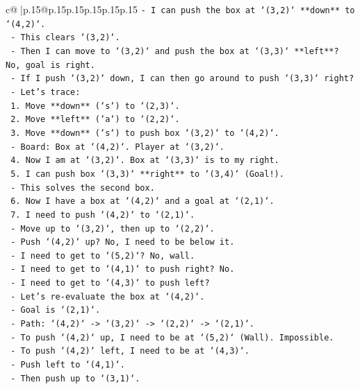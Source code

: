 \documentclass{article}
\begin{document}
{\begin{supertabular}{c@{$\;$}|p{.15\linewidth}@{}p{.15\linewidth}p{.15\linewidth}p{.15\linewidth}p{.15\linewidth}p{.15\linewidth}}
{{{\texttt{{-} I can push the box at `(3,2)` **down** to `(4,2)`.} \\
\texttt{  {-} This clears `(3,2)`.} \\
\texttt{  {-} Then I can move to `(3,2)` and push the box at `(3,3)` **left**? No, goal is right.} \\
\texttt{  {-} If I push `(3,2)` down, I can then go around to push `(3,3)` right?} \\
\texttt{  {-} Let's trace:} \\
\texttt{    1. Move **down** (`s`) to `(2,3)`.} \\
\texttt{    2. Move **left** (`a`) to `(2,2)`.} \\
\texttt{    3. Move **down** (`s`) to push box `(3,2)` to `(4,2)`.} \\
\texttt{       {-} Board: Box at `(4,2)`. Player at `(3,2)`.} \\
\texttt{    4. Now I am at `(3,2)`. Box at `(3,3)` is to my right.} \\
\texttt{    5. I can push box `(3,3)` **right** to `(3,4)` (Goal!).} \\
\texttt{       {-} This solves the second box.} \\
\texttt{    6. Now I have a box at `(4,2)` and a goal at `(2,1)`.} \\
\texttt{    7. I need to push `(4,2)` to `(2,1)`.} \\
\texttt{       {-} Move up to `(3,2)`, then up to `(2,2)`.} \\
\texttt{       {-} Push `(4,2)` up? No, I need to be below it.} \\
\texttt{       {-} I need to get to `(5,2)`? No, wall.} \\
\texttt{       {-} I need to get to `(4,1)` to push right? No.} \\
\texttt{       {-} I need to get to `(4,3)` to push left?} \\
\texttt{       {-} Let's re{-}evaluate the box at `(4,2)`.} \\
\texttt{       {-} Goal is `(2,1)`.} \\
\texttt{       {-} Path: `(4,2)` {-}> `(3,2)` {-}> `(2,2)` {-}> `(2,1)`.} \\
\texttt{       {-} To push `(4,2)` up, I need to be at `(5,2)` (Wall). Impossible.} \\
\texttt{       {-} To push `(4,2)` left, I need to be at `(4,3)`.} \\
\texttt{         {-} Push left to `(4,1)`.} \\
\texttt{         {-} Then push up to `(3,1)`.} \\
}}}
\end{supertabular}}
\end{document}
